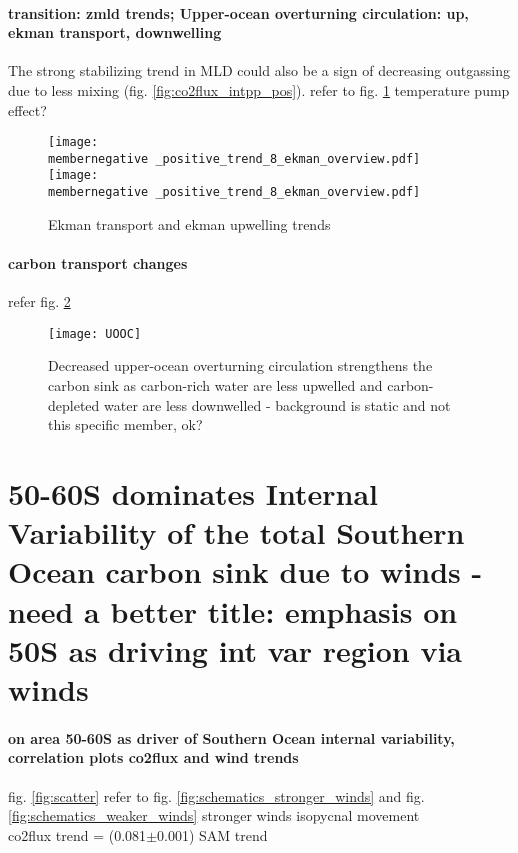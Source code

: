 \documentclass[12pt]{article}
\newcommand{\membernegative}{m143_1995_2002}
\begin{document}
\paragraph{transition: zmld trends; Upper-ocean overturning circulation: up, ekman transport, downwelling} 
The strong  stabilizing trend in MLD could also be a sign of decreasing outgassing due to less mixing (fig. \ref{fig:co2flux_intpp_pos}). refer to fig. \ref{fig:ekman_pos} temperature pump effect?

\begin{figure}[h!]
	\centering
	\texttt{[image: \\membernegative \_positive\_trend\_8\_ekman\_overview.pdf]}
	\texttt{[image: \\membernegative \_positive\_trend\_8\_ekman\_overview.pdf]}
	\caption{Ekman transport and ekman upwelling trends}
	\label{fig:ekman_pos}
\end{figure}


\paragraph{carbon transport changes}
refer fig. \ref{fig:UOOC_pos}


\begin{figure}[h!]
	\centering
	\texttt{[image: UOOC]}
	\vspace{-5mm}
	\caption{Decreased upper-ocean overturning circulation strengthens the carbon sink as carbon-rich water are less upwelled and carbon-depleted water are less downwelled - background is static and not this specific member, ok?}%
	\label{fig:UOOC_pos}
\end{figure}




\clearpage

\section{50-60S dominates Internal Variability of the total Southern Ocean carbon sink due to winds - need a better title: emphasis on 50S as driving int var region via winds}

\paragraph{on area 50-60S as driver of Southern Ocean internal variability, correlation plots co2flux and wind trends} fig. \ref{fig:scatter} refer to fig. \ref{fig:schematics_stronger_winds} and fig. \ref{fig:schematics_weaker_winds}
stronger winds isopycnal movement \citep{Lauderdale2013}
\\ co2flux trend = (0.081$\pm$0.001) SAM trend 
\end{document}
